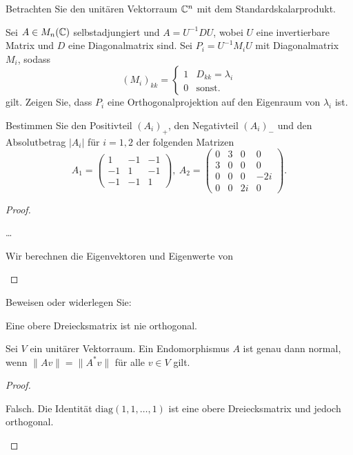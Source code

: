 \begin{Problem}
	Betrachten Sie den unitären Vektorraum $\mathbb{C}^n$ mit dem Standardskalarprodukt.
	\begin{parts}
		\item Sei $A\in M_n(\mathbb{C})$ selbstadjungiert und $A=U^{-1}DU$, wobei $U$ eine invertierbare Matrix und $D$ eine Diagonalmatrix sind. Sei $P_i=U^{-1}M_iU$ mit Diagonalmatrix $M_i$, sodass
		\[
			(M_i)_{kk}=\begin{cases}
				1 & D_{kk}=\lambda_i\\
				0 & \text{sonst.}
			\end{cases}
		\]
		gilt. Zeigen Sie, dass $P_i$ eine Orthogonalprojektion auf den Eigenraum von $\lambda_i$ ist.
		\item Bestimmen Sie den Positivteil $(A_i)_+$, den Negativteil $(A_i)_{-}$ und den Absolutbetrag $|A_i|$ f\"{u}r $i=1,2$ der folgenden Matrizen
			\[
				A_1=\begin{pmatrix} 1 & -1 & -1 \\ -1 & 1 & -1 \\ -1 & -1 & 1 \end{pmatrix},~A_2=\begin{pmatrix} 0 & 3 & 0 & 0 \\ 3 & 0 & 0 & 0 \\ 0 & 0 & 0 & -2i \\ 0 & 0 & 2i & 0 \end{pmatrix} 
			.\] 
	\end{parts}
\end{Problem}
\begin{proof}
	\begin{parts}
	\item \ldots
	\item Wir berechnen die Eigenvektoren und Eigenwerte von 
	\end{parts}
\end{proof}
\begin{Problem}
	Beweisen oder widerlegen Sie:
	\begin{parts}
	\item Eine obere Dreiecksmatrix ist nie orthogonal.
	\item Sei $V$ ein unitärer Vektorraum. Ein Endomorphismus $A$ ist genau dann normal, wenn $\|Av\|=\|A^*v\|$ f\"{u}r alle $v\in V$ gilt.  
	\end{parts}
\end{Problem}

\begin{proof}
	\begin{parts}
	\item Falsch. Die Identität $\text{diag}(1,1,\dots, 1)$ ist eine obere Dreiecksmatrix und jedoch orthogonal.
	\end{parts}
\end{proof}

